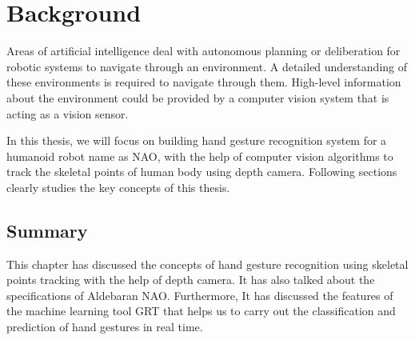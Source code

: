 \chapter{Background} \label{ch:background} Areas of artificial intelligence deal with autonomous planning or deliberation for robotic systems to navigate through an environment. A detailed understanding of these environments is required to navigate through them. High-level information about the environment could be provided by a computer vision system that is acting as a vision sensor.

In this thesis, we will focus on building hand gesture recognition system for a humanoid robot name as NAO, with the help of computer vision algorithms to track the skeletal points of human body using depth camera. Following sections clearly studies the key concepts of this thesis.

 


\section{Summary} This chapter has discussed the concepts of hand gesture recognition using skeletal points tracking with the help of depth camera. It has also talked about the specifications of Aldebaran NAO. Furthermore, It has discussed the features of the machine learning tool GRT that helps us to carry out the classification and prediction of hand gestures in real time.

